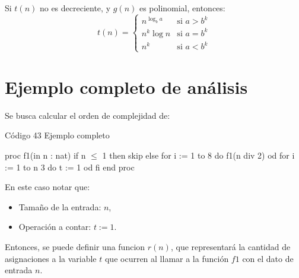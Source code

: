 Si $t(n)$ no es decreciente, y $g(n)$ es polinomial, entonces:
\begin{equation*}
    t(n) = 
    \begin{cases}
        n ^{\log_ba} & \text{si } a > b^k \\
        n^k \log n & \text{si } a = b^k \\
        n^k & \text{si } a < b^k
    \end{cases}
\end{equation*}

\section{Ejemplo completo de análisis}
Se busca calcular el orden de complejidad de:
\begin{codebox}{Código 43}
\footnotesize Ejemplo completo
\tcblower
\begin{pascallike}
proc f1(in n : nat)
    if n $\leq$ 1 then skip
    else
        for i := 1 to 8 do f1(n div 2) od
        for i := 1 to n 3 do t := 1 od
    fi
end proc
\end{pascallike}
\end{codebox}
En este caso notar que:
\begin{itemize}
    \item Tamaño de la entrada: $n$,
    \item Operación a contar: $t := 1$.
\end{itemize}
Entonces, se puede definir una funcion $r(n)$, que representará la cantidad de asignaciones a la variable $t$ que ocurren al llamar a la función $f1$ con el dato de entrada $n$.

